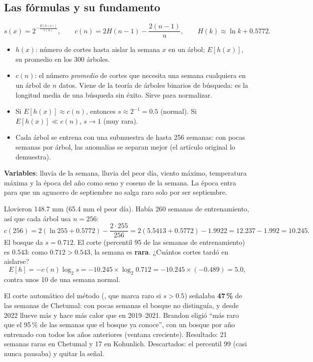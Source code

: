\subsection{Las fórmulas y su fundamento}
\[
s(x)=2^{-\frac{E[h(x)]}{c(n)}},\qquad c(n)=2H(n-1)-\frac{2(n-1)}{n},\qquad H(k)\approx \ln k+0.5772 .
\]
\begin{itemize}
\item $h(x)$: número de cortes hasta aislar la semana $x$ en un árbol; $E[h(x)]$, su promedio en los 300 árboles.
\item $c(n)$: el número \emph{promedio} de cortes que necesita una semana cualquiera en un árbol de $n$ datos. Viene de la
  teoría de árboles binarios de búsqueda: es la longitud media de una búsqueda sin éxito. Sirve para normalizar.
\item Si $E[h(x)]\approx c(n)$, entonces $s\approx 2^{-1}=0.5$ (normal). Si $E[h(x)]\ll c(n)$, $s\to1$ (muy rara).
\item Cada árbol se entrena con una submuestra de hasta 256 semanas: con pocas semanas por árbol, las anomalías se
  separan mejor (el artículo original lo demuestra).
\end{itemize}

\textbf{Variables}: lluvia de la semana, lluvia del peor día, viento máximo, temperatura máxima y la época del año como seno
y coseno de la semana. La época entra para que un aguacero de septiembre no salga raro solo por ser septiembre.

\begin{amano}
Llovieron 148.7 mm (65.4 mm el peor día). Había 260 semanas de entrenamiento, así que cada árbol usa $n=256$:
\[
c(256)=2(\ln 255+0.5772)-\frac{2\cdot255}{256}=2(5.5413+0.5772)-1.9922=12.237-1.992=10.245 .
\]
El bosque da $s=0.712$. El corte (percentil 95 de las semanas de entrenamiento) es $0.543$: como $0.712>0.543$, la semana
es \textbf{rara}. ¿Cuántos cortes tardó en aislarse?
\[
E[h]=-c(n)\log_2 s=-10.245\times\log_2 0.712=-10.245\times(-0.489)=5.0 ,
\]
contra unos 10 de una semana normal.
\end{amano}

\begin{decision}
El corte automático del método (, que marca raro si $s>0.5$) señalaba \textbf{47\,\%} de las
semanas de Chetumal: con pocas semanas el bosque no distinguía, y desde 2022 llueve más y hace más calor que en 2019–2021.
Brandon eligió ``más raro que el 95\,\% de las semanas que el bosque ya conoce'', con un bosque por año entrenado con
todos los años anteriores (ventana creciente). Resultado: 21 semanas raras en Chetumal y 17 en Kohunlich.
Descartados: el percentil 99 (casi nunca pausaba) y quitar la señal.
\end{decision}

